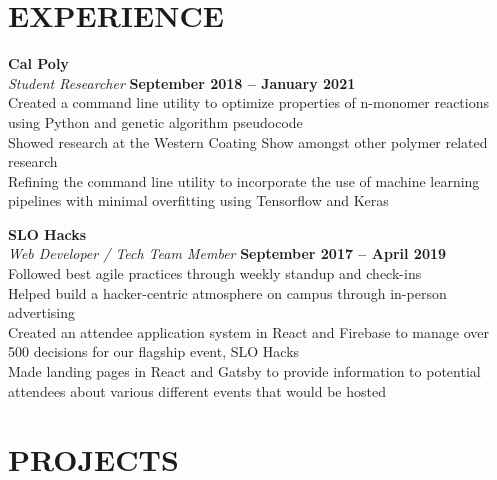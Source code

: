 \documentclass[margin,line]{resume}
\begin{document}
\begin{resume}
\sectionline

    \section{\mysidestyle \textbf{\large{E}\small{XPERIENCE}}}

    \textbf{\listing Cal Poly} \vspace{2mm}\\\vspace{1mm}%
    \textsl{Student Researcher} \hfill \textbf{September 2018 -- January 2021}\\
        Created a command line utility to optimize properties of n-monomer reactions using Python and genetic algorithm pseudocode\\
        Showed research at the Western Coating Show amongst other polymer related research \\
        Refining the command line utility to incorporate the use of machine learning pipelines with minimal overfitting using Tensorflow and Keras

    \textbf{\listing SLO Hacks} \vspace{2mm}\\\vspace{1mm}%
    \textsl{Web Developer / Tech Team Member} \hfill \textbf{September 2017 -- April 2019}\\
        Followed best agile practices through weekly standup and check-ins\\
        Helped build a hacker-centric atmosphere on campus through in-person advertising \\
        Created an attendee application system in React and Firebase to manage over 500 decisions for our flagship event, SLO Hacks \\
        Made landing pages in React and Gatsby to provide information to potential attendees about various different events that would be hosted \\

\sectionline

    \section{\mysidestyle \textbf{\large{P}\small{ROJECTS}}}


\end{resume}
\end{document}
